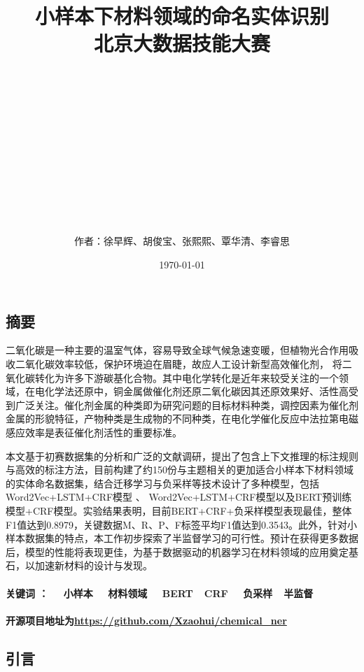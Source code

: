 \documentclass{article}
\title{小样本下材料领域的命名实体识别\\ {\small 北京大数据技能大赛}}
\author{\\\\\\\\\\\\\\\\\\\\\\\\作者：徐早辉、胡俊宝、张熙熙、覃华清、李睿思}
\date{\today}
\begin{document}
	\maketitle
	\newpage
	\begin{center}
		\tableofcontents
	\end{center}
	
	\newpage
	\begin{center}
		\section{摘要}
	\end{center}
	
	二氧化碳是一种主要的温室气体，容易导致全球气候急速变暖，但植物光合作用吸收二氧化碳效率较低，保护环境迫在眉睫，故应人工设计新型高效催化剂，
	将二氧化碳转化为许多下游碳基化合物。其中电化学转化是近年来较受关注的一个领域，在电化学法还原中，铜金属\cite{gawande2016cu}做催化剂还原二氧化碳因其还原效果好、活性高\cite{takeda2017electrons}受到广泛关注。催化剂金属的种类即为研究问题的目标材料种类，调控因素为催化剂金属的形貌特征，产物种类是生成物的不同种类，在电化学催化反应中法拉第电磁感应效率是表征催化剂活性的重要标准。
	
	
	本文基于初赛数据集的分析和广泛的文献调研，提出了包含上下文推理的标注规则与高效的标注方法，目前构建了约150份与主题相关的更加适合小样本下材料领域的实体命名数据集，结合迁移学习与负采样等技术设计了多种模型，包括 Word2Vec+LSTM+CRF模型 、 Word2Vec+LSTM+CRF模型以及BERT预训练模型+CRF模型。实验结果表明，目前BERT+CRF+负采样模型表现最佳，整体F1值达到0.8979，关键数据M、R、P、F标签平均F1值达到0.3543。此外，针对小样本数据集的特点，本工作初步探索了半监督学习的可行性。预计在获得更多数据后，模型的性能将表现更佳，为基于数据驱动的机器学习在材料领域的应用奠定基石，以加速新材料的设计与发现。
\paragraph{关键词 ： ~~小样本 ~~材料领域  ~~BERT~~CRF ~~负采样~~半监督}
	
\paragraph{开源项目地址为\url{https://github.com/Xzaohui/chemical_ner}}
	\newpage
	
	
	
	
	\begin{center}
		\section{引言}
	\end{center}
\end{document}

